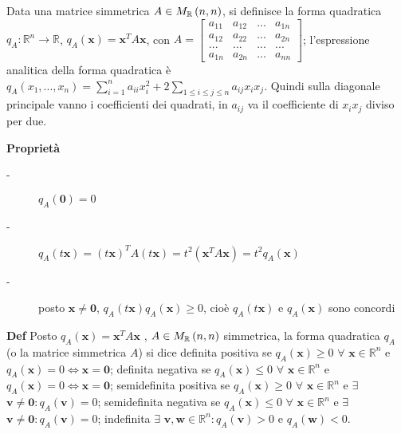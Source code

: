 \documentclass{article}
\begin{document}
Data una matrice simmetrica $A\in M_{%
\mathbb{R}
}\left( n,n\right) $, si definisce la forma quadratica $q_{A}:%
\mathbb{R}
^{n}\rightarrow 
\mathbb{R}
$, $q_{A}\left( \mathbf{x}\right) =\mathbf{x}^{T}A\mathbf{x}$, con $A=\left[ 
\begin{array}{cccc}
a_{11} & a_{12} & ... & a_{1n} \\ 
a_{12} & a_{22} & ... & a_{2n} \\ 
... & ... & ... & ... \\ 
a_{1n} & a_{2n} & ... & a_{nn}%
\end{array}%
\right] $; l'espressione analitica della forma quadratica \`{e} $q_{A}\left(
x_{1},...,x_{n}\right) =\sum_{i=1}^{n}a_{ii}x_{i}^{2}+2\sum_{1\leq i\leq
j\leq n}a_{ij}x_{i}x_{j}$. Quindi sulla diagonale principale vanno i
coefficienti dei quadrati, in $a_{ij}$ va il coefficiente di $x_{i}x_{j}$
diviso per due.

\textbf{Propriet\`{a}}

\begin{description}
\item[-] $q_{A}\left( \mathbf{0}\right) =0$

\item[-] $q_{A}\left( t\mathbf{x}\right) =\left( t\mathbf{x}\right)
^{T}A\left( t\mathbf{x}\right) =t^{2}\left( \mathbf{x}^{T}A\mathbf{x}\right)
=t^{2}q_{A}\left( \mathbf{x}\right) $

\item[-] posto $\mathbf{x\neq 0}$, $q_{A}\left( t\mathbf{x}\right)
q_{A}\left( \mathbf{x}\right) \geq 0$, cio\`{e} $q_{A}\left( t\mathbf{x}%
\right) $ e $q_{A}\left( \mathbf{x}\right) $ sono concordi
\end{description}

\textbf{Def} Posto $q_{A}\left( \mathbf{x}\right) =\mathbf{x}^{T}A\mathbf{x}$%
, $A\in M_{%
\mathbb{R}
}\left( n,n\right) $ simmetrica, la forma quadratica $q_{A}$ (o la matrice
simmetrica $A$) si dice definita positiva se $q_{A}\left( \mathbf{x}\right)
\geq 0$ $\forall $ $\mathbf{x}\in 
\mathbb{R}
^{n}$ e $q_{A}\left( \mathbf{x}\right) =0\Longleftrightarrow \mathbf{x=0}$;
definita negativa se $q_{A}\left( \mathbf{x}\right) \leq 0$ $\forall $ $%
\mathbf{x}\in 
\mathbb{R}
^{n}$ e $q_{A}\left( \mathbf{x}\right) =0\Longleftrightarrow \mathbf{x=0}$;
semidefinita positiva se $q_{A}\left( \mathbf{x}\right) \geq 0$ $\forall $ $%
\mathbf{x}\in 
\mathbb{R}
^{n}$ e $\exists $ $\mathbf{v\neq 0}:q_{A}\left( \mathbf{v}\right) =0$;
semidefinita negativa se $q_{A}\left( \mathbf{x}\right) \leq 0$ $\forall $ $%
\mathbf{x}\in 
\mathbb{R}
^{n}$ e $\exists $ $\mathbf{v\neq 0}:q_{A}\left( \mathbf{v}\right) =0$;
indefinita $\exists $ $\mathbf{v,w\in 
\mathbb{R}
}^{n}:q_{A}\left( \mathbf{v}\right) >0$ e $q_{A}\left( \mathbf{w}\right) <0$.
\end{document}
